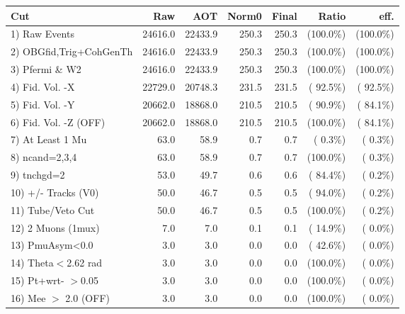 \begin{table}[h!]\centering
 \begin{tabular}{||l||r|r|r|r|r|r||}
 \hline
 \hline
 Cut & Raw & AOT & Norm0 & Final & Ratio & eff.       \\
 \hline
  1) Raw Events           &      24616.0 &      22433.9 &        250.3 &        250.3 & (100.0\%) & (100.0\%) \\
  2) OBGfid,Trig+CohGenTh &      24616.0 &      22433.9 &        250.3 &        250.3 & (100.0\%) & (100.0\%) \\
  3) Pfermi \& W2         &      24616.0 &      22433.9 &        250.3 &        250.3 & (100.0\%) & (100.0\%) \\
  4) Fid. Vol. -X         &      22729.0 &      20748.3 &        231.5 &        231.5 & ( 92.5\%) & ( 92.5\%) \\
  5) Fid. Vol. -Y         &      20662.0 &      18868.0 &        210.5 &        210.5 & ( 90.9\%) & ( 84.1\%) \\
  6) Fid. Vol. -Z (OFF)   &      20662.0 &      18868.0 &        210.5 &        210.5 & (100.0\%) & ( 84.1\%) \\
  7) At Least 1 Mu        &         63.0 &         58.9 &          0.7 &          0.7 & (  0.3\%) & (  0.3\%) \\
  8) ncand=2,3,4          &         63.0 &         58.9 &          0.7 &          0.7 & (100.0\%) & (  0.3\%) \\
  9) tnchgd=2             &         53.0 &         49.7 &          0.6 &          0.6 & ( 84.4\%) & (  0.2\%) \\
 10) +/- Tracks (V0)      &         50.0 &         46.7 &          0.5 &          0.5 & ( 94.0\%) & (  0.2\%) \\
 11) Tube/Veto Cut        &         50.0 &         46.7 &          0.5 &          0.5 & (100.0\%) & (  0.2\%) \\
 12) 2 Muons (1mux)       &          7.0 &          7.0 &          0.1 &          0.1 & ( 14.9\%) & (  0.0\%) \\
 13) PmuAsym<0.0          &          3.0 &          3.0 &          0.0 &          0.0 & ( 42.6\%) & (  0.0\%) \\
 14) Theta$<$2.62 rad     &          3.0 &          3.0 &          0.0 &          0.0 & (100.0\%) & (  0.0\%) \\
 15) Pt+wrt- $>$0.05      &          3.0 &          3.0 &          0.0 &          0.0 & (100.0\%) & (  0.0\%) \\
 16) Mee $>$ 2.0  (OFF)   &          3.0 &          3.0 &          0.0 &          0.0 & (100.0\%) & (  0.0\%) \\

\end{tabular}
\end{table}
